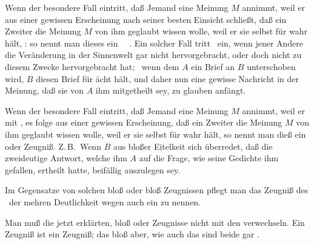 \begin{aufza}
\item Wenn der besondere Fall eintritt, daß Jemand eine Meinung $M$ annimmt, weil er aus einer gewissen Erscheinung nach seiner besten Einsicht schließt, daß ein Zweiter die Meinung $M$ von ihm geglaubt wissen wolle, weil er sie selbst für wahr hält, : so nennt man dieses ein ~\ . Ein solcher Fall tritt \zB\ ein, wenn jener Andere die Veränderung in der Sinnenwelt gar nicht hervorgebracht, oder doch nicht zu diesem Zwecke hervorgebracht hat; \zB\ wenn dem $A$ ein Brief an $B$ unterschoben wird, $B$ diesen Brief für ächt hält, und daher nun eine gewisse Nachricht in der Meinung, daß sie von $A$ ihm mitgetheilt sey, zu glauben anfängt.
\item Wenn der besondere Fall eintritt, daß Jemand eine Meinung $M$ annimmt, weil er mit , es folge aus einer gewissen Erscheinung, daß ein Zweiter die Meinung $M$ von ihm geglaubt wissen wolle, weil er sie selbst für wahr hält, so nennt man dieß ein  oder  Zeugniß. Z.\,B.\ Wenn $B$ aus bloßer Eitelkeit sich überredet, daß die zweideutige Antwort, welche ihm $A$ auf die Frage, wie seine Gedichte ihm gefallen, ertheilt hatte, beifällig auszulegen sey.
\item Im Gegensatze von solchen bloß  oder bloß  Zeugnissen pflegt man das Zeugniß des \ der mehren Deutlichkeit wegen auch ein  zu nennen.
\item Man muß die jetzt erklärten, bloß  oder  Zeugnisse nicht mit den  verwechseln. Ein  Zeugniß ist ein  Zeugniß; das bloß  aber, wie auch das  sind beide gar .
\end{aufza}

